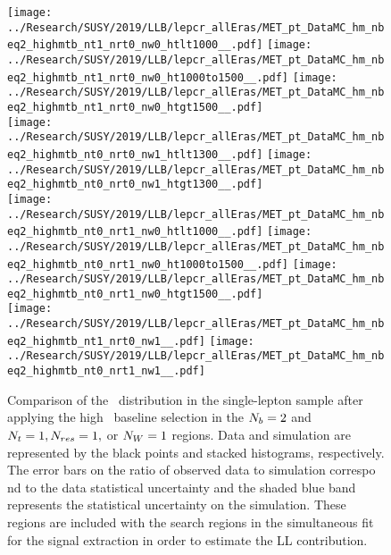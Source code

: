 \begin{figure}[!htb]
	\begin{center}
  \texttt{[image: ../Research/SUSY/2019/LLB/lepcr\_allEras/MET\_pt\_DataMC\_hm\_nbeq2\_highmtb\_nt1\_nrt0\_nw0\_htlt1000\_\_.pdf]}
  \texttt{[image: ../Research/SUSY/2019/LLB/lepcr\_allEras/MET\_pt\_DataMC\_hm\_nbeq2\_highmtb\_nt1\_nrt0\_nw0\_ht1000to1500\_\_.pdf]}
  \texttt{[image: ../Research/SUSY/2019/LLB/lepcr\_allEras/MET\_pt\_DataMC\_hm\_nbeq2\_highmtb\_nt1\_nrt0\_nw0\_htgt1500\_\_.pdf]} \\
  \texttt{[image: ../Research/SUSY/2019/LLB/lepcr\_allEras/MET\_pt\_DataMC\_hm\_nbeq2\_highmtb\_nt0\_nrt0\_nw1\_htlt1300\_\_.pdf]} 
  \texttt{[image: ../Research/SUSY/2019/LLB/lepcr\_allEras/MET\_pt\_DataMC\_hm\_nbeq2\_highmtb\_nt0\_nrt0\_nw1\_htgt1300\_\_.pdf]} \\
  \texttt{[image: ../Research/SUSY/2019/LLB/lepcr\_allEras/MET\_pt\_DataMC\_hm\_nbeq2\_highmtb\_nt0\_nrt1\_nw0\_htlt1000\_\_.pdf]} 
  \texttt{[image: ../Research/SUSY/2019/LLB/lepcr\_allEras/MET\_pt\_DataMC\_hm\_nbeq2\_highmtb\_nt0\_nrt1\_nw0\_ht1000to1500\_\_.pdf]} 
  \texttt{[image: ../Research/SUSY/2019/LLB/lepcr\_allEras/MET\_pt\_DataMC\_hm\_nbeq2\_highmtb\_nt0\_nrt1\_nw0\_htgt1500\_\_.pdf]} \\
  \texttt{[image: ../Research/SUSY/2019/LLB/lepcr\_allEras/MET\_pt\_DataMC\_hm\_nbeq2\_highmtb\_nt1\_nrt0\_nw1\_\_.pdf]} 
  \texttt{[image: ../Research/SUSY/2019/LLB/lepcr\_allEras/MET\_pt\_DataMC\_hm\_nbeq2\_highmtb\_nt0\_nrt1\_nw1\_\_.pdf]} \\
	\end{center}
	\caption{Comparison of the \met~distribution in the single-lepton sample after applying the high \dm~baseline selection in the $N_{b}=2$ and $N_{t}=1, N_{res}=1,$ or $N_{W}=1$ regions. Data and simulation are represented by the black points and stacked histograms, respectively. The error bars on the ratio of observed data to simulation correspo    nd to the data statistical uncertainty and the shaded blue band represents the statistical uncertainty on the simulation. These regions are included with the search regions in the simultaneous fit for the signal extraction in order to estimate the LL contribution.
	 }
	\label{fig:llb-1lcr-datavsmc-hm-nb2-1}
\end{figure}

